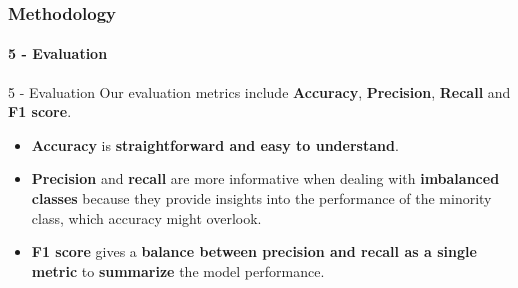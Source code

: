 	

	


	
	
	


\begin{frame}
	\frametitle{Methodology}
	\framesubtitle{5 - Evaluation}	
	
	\begin{block}{5 - Evaluation} 
			Our evaluation metrics include \textbf{Accuracy}, \textbf{Precision}, \textbf{Recall} and \textbf{F1 score}.
	\end{block}

	\begin{block}{} 
		\begin{itemize}
			\item \textbf{Accuracy} is \textbf{straightforward and easy to understand}.
			\item \textbf{Precision} and \textbf{recall} are more informative when dealing with \textbf{imbalanced classes} because they provide insights into the performance of the minority class, which accuracy might overlook.
			
			\item \textbf{F1 score} gives a \textbf{balance between precision and recall as a single metric} to \textbf{summarize} the model performance.
		\end{itemize}
	\end{block}
\end{frame}



